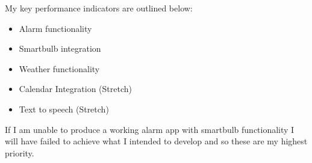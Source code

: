 My key performance indicators are outlined below:

\begin{itemize}
\tightlist
\item
  Alarm functionality
\item
  Smartbulb integration
\item
  Weather functionality
\item
  Calendar Integration (Stretch)
\item
  Text to speech (Stretch)
\end{itemize}

If I am unable to produce a working alarm app with smartbulb
functionality I will have failed to achieve what I intended to develop
and so these are my highest priority.
